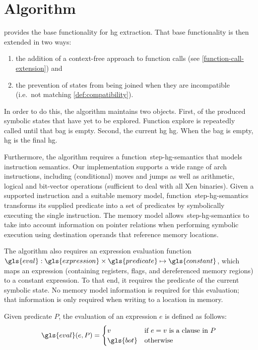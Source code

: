 \section{Algorithm}\label{sec:algorithm}
 provides the base functionality for \ac{hg} extraction.
That base functionality is then extended in two ways:
\begin{enumerate}
  \item the addition of a context-free approach to function calls (see \cref{function-call-extension}) and
  \item the prevention of states from being joined when they are incompatible (i.e.\ not matching \cref{def:compatibility}). 
\end{enumerate}
In order to do this, the algorithm maintains two objects.
First,  of the produced symbolic states that have yet to be explored.
Function \gls{explore} is repeatedly called until that \gls{bag} is empty.
Second, the current \ac{hg} \gls{hg}.
When the \gls{bag} is empty, \gls{hg} is the final \ac{hg}.

Furthermore, the algorithm requires a function~\gls{step-hg-semantics} that models instruction semantics.
Our implementation supports a wide range of \gls{arch} instructions,
including (conditional) moves and jumps as well as
arithmetic, logical and bit-vector operations (sufficient to deal with all Xen binaries).
Given a supported instruction and a suitable memory model,
function~\gls{step-hg-semantics} transforms its supplied predicate
into a set of predicates 
by symbolically executing the single instruction.
The memory model allows~\gls{step-hg-semantics} to take into account information on pointer relations
when performing symbolic execution using destination operands
that reference memory locations.


The algorithm also requires an expression evaluation function
$\gls{eval}:\gls{expression}\times\gls{predicate}\mapsto\gls{constant}$,
which maps an expression (containing registers, flags, and dereferenced memory regions)
to a constant expression.
To that end, it requires the predicate of the current symbolic state.
No memory model information is required for this evaluation;
that information is only required when writing to a location in memory.
\begin{definition}\label{def:eval}
  Given predicate $P$,  the evaluation of an expression $e$ is defined as follows:
  \begin{equation*}
    \gls{eval}(e,P)=\begin{cases}
      v & \text{if $e = v$ is a clause in }P \\
      \gls{bot} & \text{otherwise}
    \end{cases}
  \end{equation*}
\end{definition}


